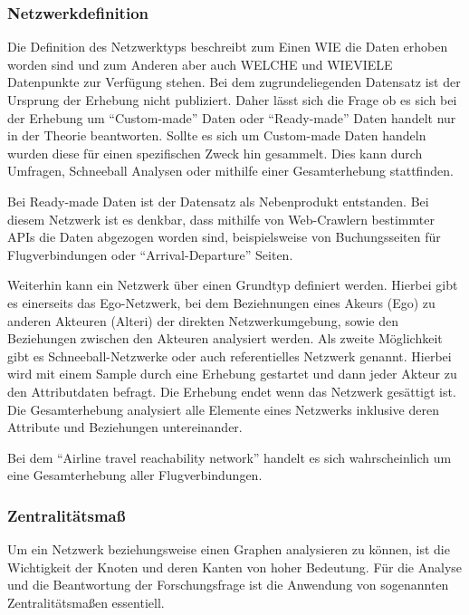 \documentclass[]{article}
\begin{document}
\hypertarget{netzwerkdefinition}{%
\subsubsection{Netzwerkdefinition}\label{netzwerkdefinition}}

Die Definition des Netzwerktyps beschreibt zum Einen WIE die Daten
erhoben worden sind und zum Anderen aber auch WELCHE und WIEVIELE
Datenpunkte zur Verfügung stehen. Bei dem zugrundeliegenden Datensatz
ist der Ursprung der Erhebung nicht publiziert. Daher lässt sich die
Frage ob es sich bei der Erhebung um ``Custom-made'' Daten oder
``Ready-made'' Daten handelt nur in der Theorie beantworten. Sollte es
sich um Custom-made Daten handeln wurden diese für einen spezifischen
Zweck hin gesammelt. Dies kann durch Umfragen, Schneeball Analysen oder
mithilfe einer Gesamterhebung stattfinden.

Bei Ready-made Daten ist der Datensatz als Nebenprodukt entstanden. Bei
diesem Netzwerk ist es denkbar, dass mithilfe von Web-Crawlern
bestimmter APIs die Daten abgezogen worden sind, beispielsweise von
Buchungsseiten für Flugverbindungen oder ``Arrival-Departure'' Seiten.

Weiterhin kann ein Netzwerk über einen Grundtyp definiert werden.
Hierbei gibt es einerseits das Ego-Netzwerk, bei dem Beziehnungen eines
Akeurs (Ego) zu anderen Akteuren (Alteri) der direkten Netzwerkumgebung,
sowie den Beziehungen zwischen den Akteuren analysiert werden. Als
zweite Möglichkeit gibt es Schneeball-Netzwerke oder auch referentielles
Netzwerk genannt. Hierbei wird mit einem Sample durch eine Erhebung
gestartet und dann jeder Akteur zu den Attributdaten befragt. Die
Erhebung endet wenn das Netzwerk gesättigt ist. Die Gesamterhebung
analysiert alle Elemente eines Netzwerks inklusive deren Attribute und
Beziehungen untereinander.

Bei dem ``Airline travel reachability network'' handelt es sich
wahrscheinlich um eine Gesamterhebung aller Flugverbindungen.

\hypertarget{zentralituxe4tsmauxdf}{%
\subsubsection{Zentralitätsmaß}\label{zentralituxe4tsmauxdf}}

Um ein Netzwerk beziehungsweise einen Graphen analysieren zu können, ist
die Wichtigkeit der Knoten und deren Kanten von hoher Bedeutung. Für die
Analyse und die Beantwortung der Forschungsfrage ist die Anwendung von
sogenannten Zentralitätsmaßen essentiell.
\end{document}
